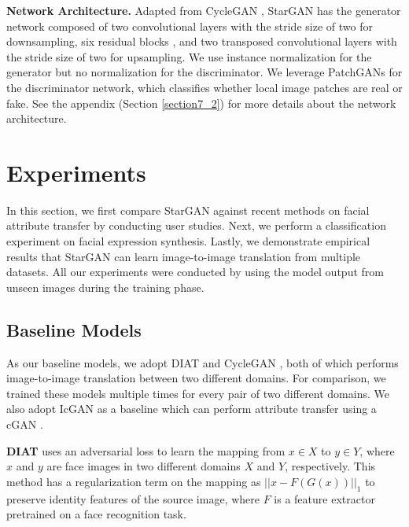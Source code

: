 \textbf{Network Architecture.} Adapted from CycleGAN \cite{zhu2017unpaired}, StarGAN has the generator network composed of two convolutional layers with the stride size of two for downsampling, six residual blocks \cite{he2016deep}, and two transposed convolutional layers with the stride size of two for upsampling. We use instance normalization \cite{ulyanov2016instance} for the generator but no normalization for the discriminator. We leverage PatchGANs \cite{Isola_2017_CVPR,li2016precomputed,zhu2017unpaired} for the discriminator network, which classifies whether local image patches are real or fake. See the appendix (Section \ref{section7_2}) for more details about the network architecture.

\section{Experiments} \label{experiments}

In this section, we first compare StarGAN against recent methods on facial attribute transfer by conducting user studies. Next, we perform a classification experiment on facial expression synthesis. Lastly, we demonstrate empirical results that StarGAN can learn image-to-image translation from multiple datasets. All our experiments were conducted by using the model output from unseen images during the training phase. 

\subsection{Baseline Models} As our baseline models, we adopt DIAT \cite{li2016deep} and CycleGAN \cite{zhu2017unpaired}, both of which performs image-to-image translation between two different domains. For comparison, we trained these models multiple times for every pair of two different domains. We also adopt IcGAN \cite{perarnau2016invertible} as a baseline which can perform attribute transfer using a cGAN \cite{odena2016conditional}. 

\medskip

 \textbf{DIAT} uses an adversarial loss to learn the mapping from $x \in X$ to $y \in Y$, where $x$ and $y$ are face images in two different domains $X$ and $Y$, respectively. This method has a regularization term on the mapping as ${||x - F(G(x))||}_{1} $ to preserve identity features of the source image, where $F$ is a feature extractor pretrained on a face recognition task. 

\medskip

